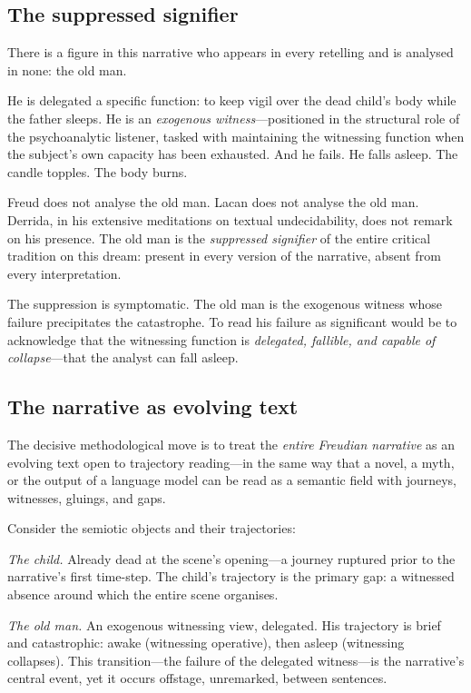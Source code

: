 \subsection{The suppressed signifier}

There is a figure in this narrative who appears in every retelling and is analysed in none: the old man.

He is delegated a specific function: to keep vigil over the dead child's body while the father sleeps.  He is an \textit{exogenous witness}---positioned in the structural role of the psychoanalytic listener, tasked with maintaining the witnessing function when the subject's own capacity has been exhausted.  And he fails.  He falls asleep.  The candle topples.  The body burns.

Freud does not analyse the old man.  Lacan does not analyse the old man.  Derrida, in his extensive meditations on textual undecidability, does not remark on his presence.  The old man is the \textit{suppressed signifier} of the entire critical tradition on this dream: present in every version of the narrative, absent from every interpretation.

The suppression is symptomatic.  The old man is the exogenous witness whose failure precipitates the catastrophe.  To read his failure as significant would be to acknowledge that the witnessing function is \textit{delegated, fallible, and capable of collapse}---that the analyst can fall asleep.

\subsection{The narrative as evolving text}

The decisive methodological move is to treat the \textit{entire Freudian narrative} as an evolving text open to trajectory reading---in the same way that a novel, a myth, or the output of a language model can be read as a semantic field with journeys, witnesses, gluings, and gaps.

Consider the semiotic objects and their trajectories:

\textit{The child.}  Already dead at the scene's opening---a journey ruptured prior to the narrative's first time-step.  The child's trajectory is the primary gap: a witnessed absence around which the entire scene organises.

\textit{The old man.}  An exogenous witnessing view, delegated.  His trajectory is brief and catastrophic: awake (witnessing operative), then asleep (witnessing collapses).  This transition---the failure of the delegated witness---is the narrative's central event, yet it occurs offstage, unremarked, between sentences.

